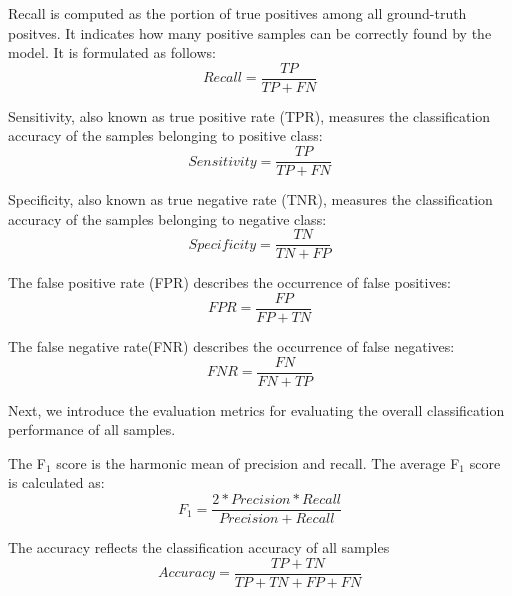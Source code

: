 \documentclass[10pt,journal,compsoc]{IEEEtran}
\begin{document}
Recall is computed as the portion of true positives among all ground-truth positves. It indicates how many positive samples can be correctly found by the model. It is formulated as follows:
\vspace{-0.2cm}
\begin{equation}
Recall=\frac{TP}{TP + FN}
\end{equation}

Sensitivity, also known as true positive rate (TPR), measures the classification accuracy of the samples belonging to positive class:
\vspace{-0.3cm}
\begin{equation}
Sensitivity=\frac{TP}{TP + FN}
\end{equation}

Specificity, also known as true negative rate (TNR), measures the classification accuracy of the samples belonging to negative class:
\vspace{-0.3cm}
\begin{equation}
Specificity=\frac{TN}{TN + FP}
\end{equation}

The false positive rate (FPR) describes the occurrence of false positives:
\vspace{-0.2cm}
\begin{equation}
FPR=\frac{FP}{FP + TN}
\end{equation}

The false negative rate(FNR) describes the occurrence of false negatives:
\vspace{-0.2cm}
\begin{equation}
FNR=\frac{FN}{FN + TP}
\end{equation}

Next, we introduce the evaluation metrics for evaluating the overall classification performance of all samples.

The F$_1$ score is the harmonic mean of precision and recall. The average F$_1$ score is calculated as:
\vspace{-0.1cm}
\begin{equation}
F_1=\frac{2*Precision*Recall}{Precision + Recall}
\end{equation}

The accuracy reflects the classification accuracy of all samples
\vspace{-0.2cm}
\begin{equation}
Accuracy=\frac{TP+TN}{TP + TN+FP+FN}
\end{equation}
\end{document}

